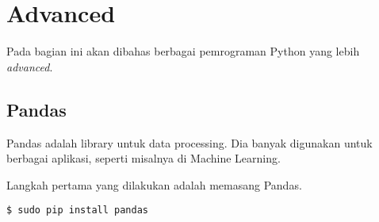 \chapter{Advanced}
Pada bagian ini akan dibahas berbagai pemrograman Python yang lebih {\em advanced}.

\section{Pandas}
Pandas adalah library untuk data processing. Dia banyak digunakan untuk
berbagai aplikasi, seperti misalnya di Machine Learning.

Langkah pertama yang dilakukan adalah memasang Pandas.

\begin{verbatim}
$ sudo pip install pandas
\end{verbatim}

